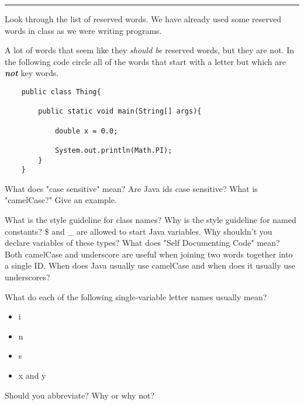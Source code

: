 \documentclass[letter,11pt]{exam}
\begin{document}
\begin{questions}
\rule{1.0\textwidth}{0.4pt}
\question Look through the list of reserved words.  We have already used some reserved words in class as we were writing programs.  

\begin{samepage}
\question A lot of words that seem like they \textit{should be} reserved words, but they are not.  In the following code circle all of the words that start with a letter but which are \textbf{\textit{not}} key words.

\begin{verbatim}
    public class Thing{

        public static void main(String[] args){
            
            double x = 0.0;

            System.out.println(Math.PI);
        }
    }
\end{verbatim}
\end{samepage}
\question What does "case sensitive" mean?  Are Java ids case sensitive?
\question What is "camelCase?"  Give an example.

\question What is the style guideline for class names?
\question Why is the style guideline for named constants?
\question \$ and \_ are allowed to start Java variables.  Why shouldn't you declare variables of these types?
\question What does "Self Documenting Code" mean?
\question Both camelCase and underscore are useful when joining two words together into a single ID.  When does Java usually use camelCase and when does it usually use underscores?
\begin{samepage}
\question What do each of the following single-variable letter names usually mean?
\begin{itemize} 
  \item i
  \item n
  \item s
  \item x and y
\end{itemize}
\end{samepage}
\question Should you abbreviate?  Why or why not?\\


\end{questions}
\end{document}
